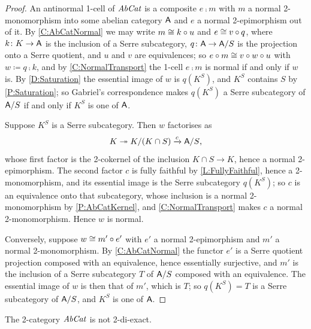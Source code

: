 \begin{proof}
  An antinormal 1-cell of \(\mathit{AbCat}\) is a composite \(e\comp m\) with \(m\) a normal 2-monomorphism into some abelian category \(\mathsf{A}\) and \(e\) a normal 2-epimorphism out of it. By \corx\ref{C:AbCatNormal} we may write \(m\cong k\circ u\) and \(e\cong v\circ q\), where \(k\colon K\to\mathsf{A}\) is the inclusion of a Serre subcategory, \(q\colon\mathsf{A}\to\mathsf{A}/S\) is the projection onto a Serre quotient, and \(u\) and \(v\) are equivalences; so \(e\circ m\cong v\circ w\circ u\) with \(w\coloneq q\comp k\), and by \corx\ref{C:NormalTransport} the 1-cell \(e\comp m\) is normal if and only if \(w\) is. By \ref{D:Saturation} the essential image of \(w\) is \(q(K^{S})\), and \(K^{S}\) contains \(S\) by \prox\ref{P:Saturation}; so Gabriel's correspondence makes \(q(K^{S})\) a Serre subcategory of \(\mathsf{A}/S\) if and only if \(K^{S}\) is one of \(\mathsf{A}\).

	Suppose \(K^{S}\) is a Serre subcategory. Then \(w\) factorises as
	\[
		K\twoheadrightarrow K/(K\cap S)\xrightarrow[]{c}\mathsf{A}/S\text{,}
	\]
	whose first factor is the 2-cokernel of the inclusion \(K\cap S\to K\), hence a normal 2-epimorphism. The second factor \(c\) is fully faithful by \lemx\ref{L:FullyFaithful}, hence a 2-monomorphism, and its essential image is the Serre subcategory \(q(K^{S})\); so \(c\) is an equivalence onto that subcategory, whose inclusion is a normal 2-monomorphism by \prox\ref{P:AbCatKernel}, and \corx\ref{C:NormalTransport} makes \(c\) a normal 2-monomorphism. Hence \(w\) is normal.

	Conversely, suppose \(w\cong m'\circ e'\) with \(e'\) a normal 2-epimorphism and \(m'\) a normal 2-monomorphism. By \corx\ref{C:AbCatNormal} the functor \(e'\) is a Serre quotient projection composed with an equivalence, hence essentially surjective, and \(m'\) is the inclusion of a Serre subcategory \(T\) of \(\mathsf{A}/S\) composed with an equivalence. The essential image of \(w\) is then that of \(m'\), which is \(T\); so \(q(K^{S})=T\) is a Serre subcategory of \(\mathsf{A}/S\), and \(K^{S}\) is one of \(\mathsf{A}\).
\end{proof}

\begin{proposition}
  \label{P:AbCatFails} 
  The 2-category \(\mathit{AbCat}\) is not 2-di-exact.
\end{proposition}

